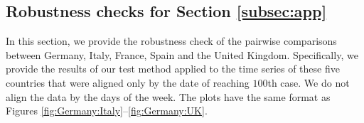 \documentclass[a4paper,12pt]{article}
\numberwithin{equation}{section}
\begin{document}
\clearpage
\subsection{Robustness checks for Section \ref{subsec:app}}\label{s:subsec:app:2}

In this section, we provide the robustness check of the pairwise comparisons between Germany, Italy, France, Spain and the United Kingdom. Specifically, we provide the results of our test method applied to the time series of these five countries that were aligned only by the date of reaching $100$th case. We do not align the data by the days of the week. The plots have the same format as Figures \ref{fig:Germany:Italy}--\ref{fig:Germany:UK}.
\begin{figure}[h!]
\begin{minipage}[t]{0.49\textwidth}

\end{minipage}
\end{figure}
\end{document}
